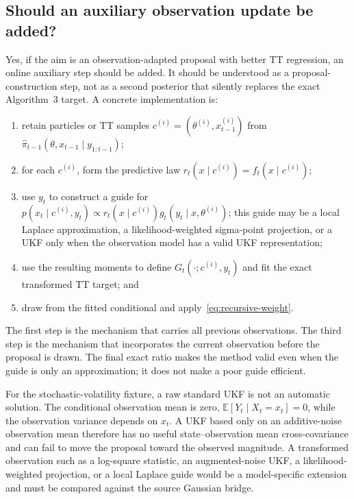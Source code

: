 \documentclass[11pt]{article}
\begin{document}
\subsection{Should an auxiliary observation update be added?}

Yes, if the aim is an observation-adapted proposal with better TT regression,
an online auxiliary step should be added. It should be understood as a
proposal-construction step, not as a second posterior that silently replaces
the exact Algorithm~3 target. A concrete implementation is:
\begin{enumerate}
\item retain particles or TT samples
      $c^{(i)}=(\theta^{(i)},x_{t-1}^{(i)})$ from
      $\widehat\pi_{t-1}(\theta,x_{t-1}\mid y_{1:t-1})$;
\item for each $c^{(i)}$, form the predictive law
      $r_t(x\mid c^{(i)})=f_t(x\mid c^{(i)})$;
\item use $y_t$ to construct a guide for
      $p(x_t\mid c^{(i)},y_t)\propto r_t(x\mid c^{(i)})g_t(y_t\mid x,\theta^{(i)})$;
      this guide may be a local Laplace approximation, a likelihood-weighted
      sigma-point projection, or a UKF only when the observation model has a
      valid UKF representation;
\item use the resulting moments to define $G_t(\cdot;c^{(i)},y_t)$ and fit
      the exact transformed TT target; and
\item draw from the fitted conditional and apply~\eqref{eq:recursive-weight}.
\end{enumerate}
The first step is the mechanism that carries all previous observations. The
third step is the mechanism that incorporates the current observation before
the proposal is drawn. The final exact ratio makes the method valid even when
the guide is only an approximation; it does not make a poor guide efficient.

For the stochastic-volatility fixture, a raw standard UKF is not an automatic
solution. The conditional observation mean is zero,
$\mathbb E[Y_t\mid X_t=x_t]=0$, while the observation variance depends on
$x_t$. A UKF based only on an additive-noise observation mean therefore has no
useful state--observation mean cross-covariance and can fail to move the
proposal toward the observed magnitude. A transformed observation such as a
log-square statistic, an augmented-noise UKF, a likelihood-weighted
projection, or a local Laplace guide would be a model-specific extension and
must be compared against the source Gaussian bridge.
\end{document}
